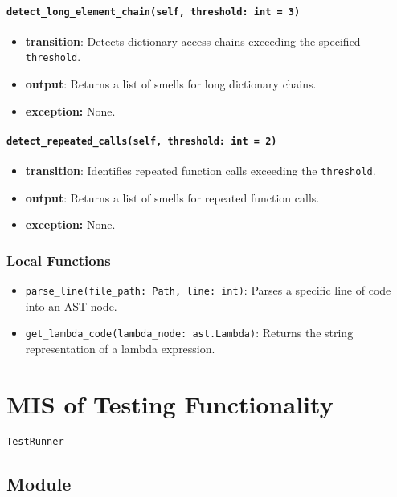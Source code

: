 \documentclass[12pt, titlepage]{article}
\begin{document}
\paragraph{\texttt{detect\_long\_element\_chain(self, threshold: int = 3)}}
\begin{itemize}
  \item \textbf{transition}: Detects dictionary access chains exceeding the specified \texttt{threshold}.
  \item \textbf{output}: Returns a list of smells for long dictionary chains.
  \item \textbf{exception:} None.
\end{itemize}

\paragraph{\texttt{detect\_repeated\_calls(self, threshold: int = 2)}}
\begin{itemize}
  \item \textbf{transition}: Identifies repeated function calls exceeding the \texttt{threshold}.
  \item \textbf{output}: Returns a list of smells for repeated function calls.
  \item \textbf{exception:} None.
\end{itemize}

\subsubsection{Local Functions}
\begin{itemize}
  \item \texttt{parse\_line(file\_path: Path, line: int)}: Parses a specific line of code into an AST node.
  \item \texttt{get\_lambda\_code(lambda\_node: ast.Lambda)}: Returns the string representation of a lambda expression.
\end{itemize}


\newpage

\section{MIS of Testing Functionality}

\texttt{TestRunner}

\subsection{Module}
\end{document}
